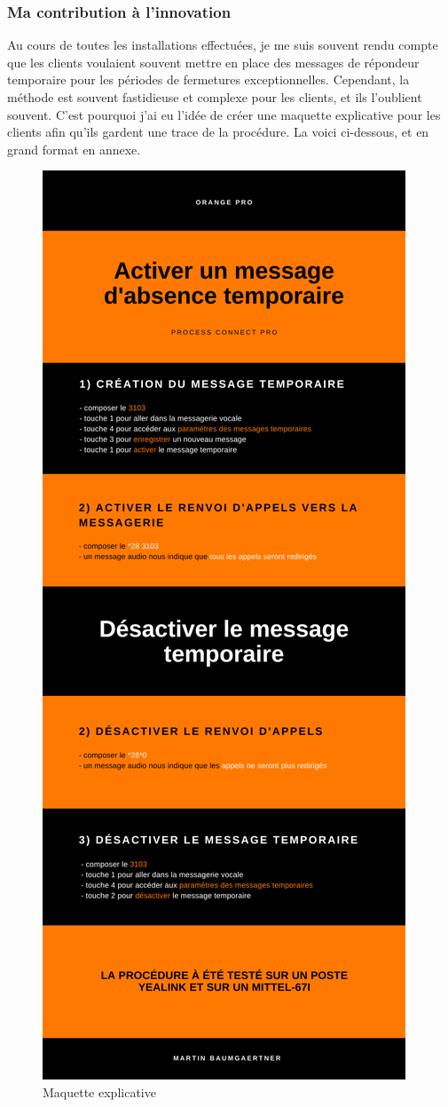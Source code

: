 \documentclass[12pt, a4paper]{article}
\begin{document}
\subsubsection{Ma contribution à l'innovation}
Au cours de toutes les installations effectuées, 
je me suis souvent rendu compte que les clients
voulaient souvent mettre en place des messages 
de répondeur temporaire pour les périodes
de fermetures exceptionnelles. Cependant,
la méthode est souvent fastidieuse et
complexe pour les clients, et ils l'oublient 
souvent. C'est pourquoi j'ai eu l'idée de
créer une maquette explicative pour les clients
afin qu'ils gardent une trace de la procédure. 
La voici ci-dessous, et en grand format en annexe.\\
\begin{figure}[h]
	\centering
	\includegraphics[scale=0.3]{img/maquette.png}
	\caption{Maquette explicative}
\end{figure}
\newpage
\end{document}
